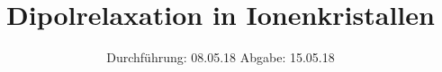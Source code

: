 

\subject{VERSUCH NUMMER 48}
\title{Dipolrelaxation in Ionenkristallen}
\date{
  Durchführung: 08.05.18
  \hspace{3em}
  Abgabe: 15.05.18
}



\maketitle
\newpage






\printbibliography


